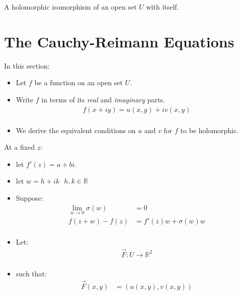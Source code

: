 \begin{defn}
	A holomorphic isomorphism of an open set $U$ with itself.
\end{defn}

\section{The Cauchy-Reimann Equations}
In this section:
\begin{itemize}
	\item Let $f$ be a function on an open set $U.$
	\item Write $f$ in terms of its \textit{real} and \textit{imaginary} parts.
	\begin{align*}
		f(x + iy) = u(x, y) + iv(x, y) \\
	\end{align*}
	\item We derive the equivalent conditions on $u$ and $v$ for $f$ to be holomorphic.
\end{itemize}

At a fixed $z$: 
\begin{itemize}
	\item let $f'(z) = a + bi.$
	\item let $w = h + ik \,\,\,\, h, k \in \mathbb{R}$
	\item Suppose:
	\begin{align*}
		\lim_{w \to 0} \sigma(w) &= 0 \\
		f(z + w) - f(z) &= f'(z)w + \sigma(w)w \\
	\end{align*}
	\item Let:
	\begin{align*}
		\vec{F}: U \to \mathbb{R}^2 \\
	\end{align*}
	\item such that:
	\begin{align*}
		\vec{F}(x, y) &= (u(x, y), v(x, y))
	\end{align*}
\end{itemize}

